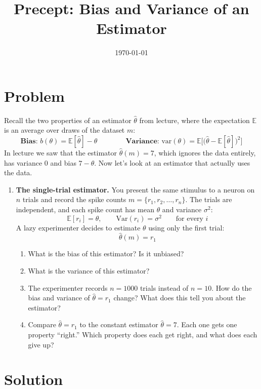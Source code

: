 \documentclass[11pt]{article}
\title{Precept: Bias and Variance of an Estimator}
\date{\today}
\begin{document}
\maketitle
\thispagestyle{fancy}

\section*{Problem}
Recall the two properties of an estimator $\hat{\theta}$ from lecture, where the expectation $\mathbb{E}$ is an average over draws of the dataset $m$:
\[
\textbf{Bias: } b(\theta)=\mathbb{E}[\hat{\theta}]-\theta
\qquad\qquad
\textbf{Variance: } \mathrm{var}(\theta)=\mathbb{E}\Big[\big(\hat{\theta}-\mathbb{E}[\hat{\theta}]\big)^2\Big]
\]
In lecture we saw that the estimator $\hat{\theta}(m)=7$, which ignores the data entirely, has variance $0$ and bias $7-\theta$. Now let's look at an estimator that actually uses the data.

\begin{enumerate}
    \item \textbf{The single-trial estimator.} You present the same stimulus to a neuron on $n$ trials and record the spike counts $m=\{r_1, r_2, \ldots, r_n\}$. The trials are independent, and each spike count has mean $\theta$ and variance $\sigma^2$:
    \[
    \mathbb{E}[r_i]=\theta, \qquad \mathrm{Var}(r_i)=\sigma^2 \qquad \text{for every } i
    \]
    A lazy experimenter decides to estimate $\theta$ using only the first trial:
    \[
    \hat{\theta}(m)=r_1
    \]
    \begin{enumerate}
        \item What is the bias of this estimator? Is it unbiased?
        \item What is the variance of this estimator?
        \item The experimenter records $n=1000$ trials instead of $n=10$. How do the bias and variance of $\hat{\theta}=r_1$ change? What does this tell you about the estimator?
        \item Compare $\hat{\theta}=r_1$ to the constant estimator $\hat{\theta}=7$. Each one gets one property ``right.'' Which property does each get right, and what does each give up?
    \end{enumerate}
\end{enumerate}

\newpage
\section*{Solution}
\end{document}
